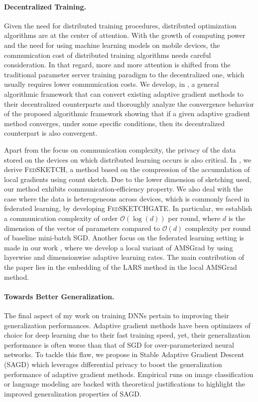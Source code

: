 \documentclass[twoside,11pt]{article}
\begin{document}
\vspace{0.08in}
\paragraph{Decentralized Training.} 
Given the need for distributed training procedures, distributed optimization algorithms are at the center of attention. 
With the growth of computing power and the need for using machine learning models on mobile devices, the communication cost of distributed training algorithms needs careful consideration. 
In that regard, more and more attention is shifted from the traditional parameter server training paradigm to the decentralized one, which usually requires lower communication costs.
We develop, in \citep{chen2020decent}, a general algorithmic framework that can convert existing adaptive gradient methods to their decentralized counterparts and thoroughly analyze the convergence behavior of the proposed algorithmic framework showing that if a given adaptive gradient method converges, under some specific conditions, then its decentralized counterpart is also convergent.

Apart from the focus on communication complexity, the privacy of the data stored on the devices on which distributed learning occurs is also critical.
In \citep{had2020}, we derive \textsc{FedSKETCH}, a method based on the compression of the accumulation of local gradients using count sketch.
Due to the lower dimension of sketching used, our method exhibits communication-efficiency property. We also deal with the case where the data is heterogeneous across devices, which is commonly faced in federated learning, by developing \textsc{FedSKETCHGATE}.
In particular, we establish a communication complexity of order $\mathcal{O}(\log(d))$ per round, where $d$ is the dimension of the vector of parameters compared to $\mathcal{O}(d)$ complexity per round of baseline mini-batch SGD.
Another focus on the federated learning setting is made in our work \citep{karimi2020lars}, where we develop a local variant of AMSGrad by using layerwise and dimensionwise adaptive learning rates. The main contribution of the paper lies in the embedding of the LARS method in the local AMSGrad method.


\vspace{0.08in}
\paragraph{Towards Better Generalization.} 
The final aspect of my work on training DNNs pertain to improving their generalization performances.
Adaptive gradient methods have been optimizers of choice for deep learning due to their fast training speed, yet, their generalization performance is often worse than that of SGD for over-parameterized neural networks. 
To tackle this flaw, we propose in \citep{zhou2020towards} Stable Adaptive Gradient Descent (\textsc{SAGD}) which leverages differential privacy to boost the generalization performance of adaptive gradient methods.
Empirical runs on image classification or language modeling are backed with theoretical justifications to highlight the improved generalization properties of \textsc{SAGD}.
\end{document}
